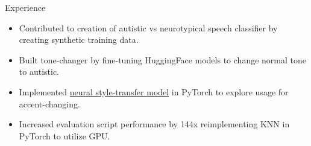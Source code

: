 \documentclass{resume} %
\begin{document}
\begin{workSection}{Experience}
	\experienceItem[
	company=UTEP Vision and Learning Lab,
	location=El Paso{,} TX,
	position=Undergraduate Research Assistant,
	duration=January 2024 - May 2024,
	]
	\begin{itemize}
		\vspace{-0.5em}
		\itemsep -6pt {}
		\item Contributed to creation of autistic vs neurotypical speech classifier by
		creating synthetic training data.
		\item Built tone-changer by fine-tuning {HuggingFace} models to change normal tone to autistic. %
		\item Implemented \href{https://github.com/AshkanArabim/neural-style-transfer}{{neural style-transfer model}} in {PyTorch} to explore usage for accent-changing.
		\item Increased evaluation script performance by
			{144x} 
			reimplementing KNN in PyTorch to utilize GPU.
	\end{itemize}
	


\end{workSection}
\end{document}
